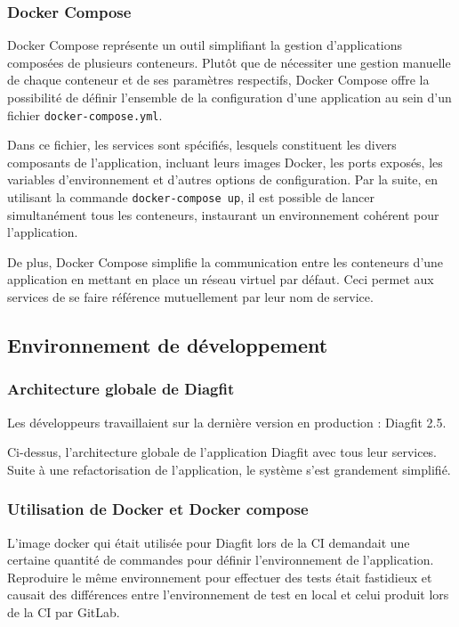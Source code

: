 \subsubsection{Docker Compose}
Docker Compose représente un outil simplifiant la gestion d'applications composées de plusieurs conteneurs.
Plutôt que de nécessiter une gestion manuelle de chaque conteneur et de ses paramètres respectifs, Docker Compose offre la possibilité de définir l'ensemble de la configuration d'une application au sein d'un fichier \texttt{docker-compose.yml}.

Dans ce fichier, les services sont spécifiés, lesquels constituent les divers composants de l'application, incluant leurs images Docker, les ports exposés, les variables d'environnement et d'autres options de configuration.
Par la suite, en utilisant la commande \texttt{docker-compose up}, il est possible de lancer simultanément tous les conteneurs, instaurant un environnement cohérent pour l'application.

De plus, Docker Compose simplifie la communication entre les conteneurs d'une application en mettant en place un réseau virtuel par défaut. Ceci permet aux services de se faire référence mutuellement par leur nom de service.


\subsection{Environnement de développement}
\subsubsection{Architecture globale de Diagfit}
Les développeurs travaillaient sur la dernière version en production : Diagfit 2.5.


Ci-dessus, l'architecture globale de l'application Diagfit avec tous leur services.
Suite à une refactorisation de l'application, le système s'est grandement simplifié.


\subsubsection{Utilisation de Docker et Docker compose}
L'image docker qui était utilisée pour Diagfit lors de la CI demandait une certaine quantité de commandes pour définir l'environnement de l'application.
Reproduire le même environnement pour effectuer des tests était fastidieux et causait des différences entre l'environnement de test en local et celui produit lors de la CI par GitLab.

